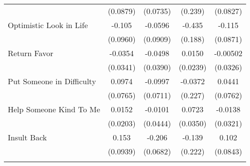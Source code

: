 {\begin{tabular}{l*{4}{c}}
            &    (0.0879)         &    (0.0735)         &     (0.239)         &    (0.0827)         \\
[1em]
Optimistic Look in Life&      -0.105         &     -0.0596         &      -0.435\sym{*}  &      -0.115         \\
            &    (0.0960)         &    (0.0909)         &     (0.188)         &    (0.0871)         \\
[1em]
Return Favor&     -0.0354         &     -0.0498         &      0.0150         &    -0.00502         \\
            &    (0.0341)         &    (0.0390)         &    (0.0239)         &    (0.0326)         \\
[1em]
Put Someone in Difficulty&      0.0974         &     -0.0997         &     -0.0372         &      0.0441         \\
            &    (0.0765)         &    (0.0711)         &     (0.227)         &    (0.0762)         \\
[1em]
Help Someone Kind To Me&      0.0152         &     -0.0101         &      0.0723\sym{*}  &     -0.0138         \\
            &    (0.0203)         &    (0.0444)         &    (0.0350)         &    (0.0321)         \\
[1em]
Insult Back &       0.153         &      -0.206\sym{**} &      -0.139         &       0.102         \\
            &    (0.0939)         &    (0.0682)         &     (0.222)         &    (0.0843)         \\
\hline\hline
{}\\
\end{tabular}
}
